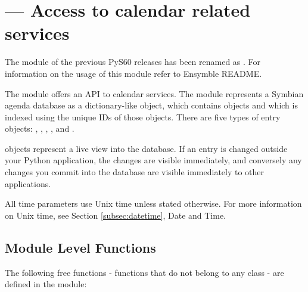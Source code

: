 %
%
%

\section{ ---
  Access to calendar related services}
\label{sec:calendareka2}


The  module of the previous PyS60 releases has been renamed 
as . For information on the usage of this module refer to 
Ensymble README.

The  module offers an API to calendar services. The 
 module represents a Symbian agenda database as a 
dictionary-like  object, which contains 
objects and which is indexed using the unique IDs of those objects. There 
are five types of entry objects: , 
, , ,
 and . 

 objects represent a live view into the database. If an 
entry is changed outside your Python application, the changes are visible 
immediately, and conversely any changes you commit into the database are 
visible immediately to other applications. 

All time parameters use Unix time unless stated otherwise. For more 
information on Unix time, see Section \ref{subsec:datetime}, 
Date and Time.

\subsection{Module Level Functions}
\label{subsec:calendarmodule}
The following free functions - functions that do not belong to any class 
- are defined in the  module:

